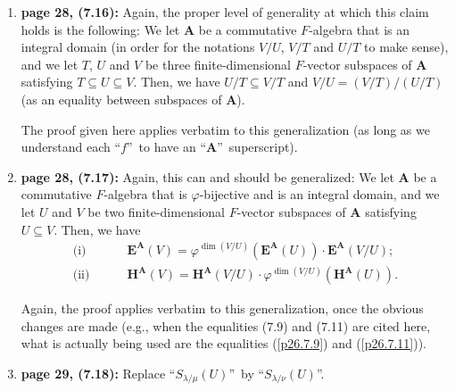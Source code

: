\documentclass[numbers=enddot,12pt,final,onecolumn,notitlepage]{scrartcl}%
\theoremstyle{definition}
\begin{document}
\begin{enumerate}
The proof of this generalization is just as easy as the original proof of
(7.15), since the polynomials $f_{V}^{\mathbf{A}}$ are given by (\ref{p26.fAV}%
). It is this general version that I believe is necessary to prove (7.19) by
induction further below.

\item \textbf{page 28, (7.16):} Again, the proper level of generality at which
this claim holds is the following: We let $\mathbf{A}$ be a commutative
$F$-algebra that is an integral domain (in order for the notations $V/U$,
$V/T$ and $U/T$ to make sense), and we let $T$, $U$ and $V$ be three
finite-dimensional $F$-vector subspaces of $\mathbf{A}$ satisfying $T\subseteq
U\subseteq V$. Then, we have $U/T\subseteq V/T$ and $V/U=\left(  V/T\right)
/\left(  U/T\right)  $ (as an equality between subspaces of $\mathbf{A}$).

The proof given here applies verbatim to this generalization (as long as we
understand each \textquotedblleft$f$\textquotedblright\ to have an
\textquotedblleft$\mathbf{A}$\textquotedblright\ superscript).

\item \textbf{page 28, (7.17):} Again, this can and should be generalized: We
let $\mathbf{A}$ be a commutative $F$-algebra that is $\varphi$-bijective and
is an integral domain, and we let $U$ and $V$ be two finite-dimensional
$F$-vector subspaces of $\mathbf{A}$ satisfying $U\subseteq V$. Then, we have%
\begin{align*}
\text{(i)}\ \ \ \ \ \ \ \ \ \  &  \mathbf{E}^{\mathbf{A}}\left(  V\right)
=\varphi^{\dim\left(  V/U\right)  }\left(  \mathbf{E}^{\mathbf{A}}\left(
U\right)  \right)  \cdot\mathbf{E}^{\mathbf{A}}\left(  V/U\right)  ;\\
\text{(ii)}\ \ \ \ \ \ \ \ \ \  &  \mathbf{H}^{\mathbf{A}}\left(  V\right)
=\mathbf{H}^{\mathbf{A}}\left(  V/U\right)  \cdot\varphi^{\dim\left(
V/U\right)  }\left(  \mathbf{H}^{\mathbf{A}}\left(  U\right)  \right)  .
\end{align*}


Again, the proof applies verbatim to this generalization, once the obvious
changes are made (e.g., when the equalities (7.9) and (7.11) are cited here,
what is actually being used are the equalities (\ref{p26.7.9}) and
(\ref{p26.7.11})).

\item \textbf{page 29, (7.18):} Replace \textquotedblleft$S_{\lambda/\mu
}\left(  U\right)  $\textquotedblright\ by \textquotedblleft$S_{\lambda/\nu
}\left(  U\right)  $\textquotedblright.


\end{enumerate}
\end{document}
